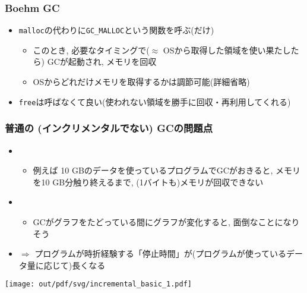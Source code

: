 \documentclass[12pt,dvipdfmx]{beamer}
\begin{document}
\begin{frame}
\frametitle{Boehm GC}
\begin{itemize}
\item {\tt malloc}の代わりに{\tt GC\_MALLOC}という関数を呼ぶ(だけ)
  \begin{itemize}
  \item このとき, 必要なタイミングで($\approx$ OSから取得した領域を使い果たしたら)
    GCが起動され, メモリを回収
  \item OSからどれだけメモリを取得するかは調節可能(詳細省略)
  \end{itemize}
  
\item {\tt free}は呼ばなくて良い(使われない領域を勝手に回収・再利用してくれる)
\end{itemize}
\end{frame}

\begin{frame}
\frametitle{普通の (インクリメンタルでない) GCの問題点}
\begin{itemize}
\item {}
  \begin{itemize}
  \item 例えば 10 GBのデータを使っているプログラムでGCがおきると,
    メモリを10 GB分触り終えるまで, (1バイトも)メモリが回収できない
  \end{itemize}
\item {}
  \begin{itemize}
  \item GCがグラフをたどっている間にグラフが変化すると,
    面倒なことになりそう
  \end{itemize}
\item $\Rightarrow$
  プログラムが時折経験する「停止時間」が(プログラムが使っているデータ量に応じて)長くなる
\end{itemize}
\begin{center}
\texttt{[image: out/pdf/svg/incremental\_basic\_1.pdf]}
\end{center}
\end{frame}
\end{document}
